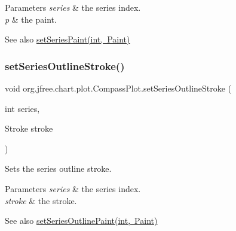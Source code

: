 \begin{DoxyParams}{Parameters}
{\em series} & the series index. \\
\hline
{\em p} & the paint.\\
\hline
\end{DoxyParams}
\begin{DoxySeeAlso}{See also}
\mbox{\hyperlink{classorg_1_1jfree_1_1chart_1_1plot_1_1_compass_plot_a87cfbe98bd7fff9715b80a2e03ca8132}{set\+Series\+Paint(int, Paint)}} 
\end{DoxySeeAlso}
\mbox{\label{classorg_1_1jfree_1_1chart_1_1plot_1_1_compass_plot_acf5f6f807b128ab9b24eda71da40f7d3}} 
\subsubsection{\texorpdfstring{set\+Series\+Outline\+Stroke()}{setSeriesOutlineStroke()}}
{\footnotesize\ttfamily void org.\+jfree.\+chart.\+plot.\+Compass\+Plot.\+set\+Series\+Outline\+Stroke (\begin{DoxyParamCaption}\item[{int}]{series,  }\item[{Stroke}]{stroke }\end{DoxyParamCaption})}

Sets the series outline stroke.


\begin{DoxyParams}{Parameters}
{\em series} & the series index. \\
\hline
{\em stroke} & the stroke.\\
\hline
\end{DoxyParams}
\begin{DoxySeeAlso}{See also}
\mbox{\hyperlink{classorg_1_1jfree_1_1chart_1_1plot_1_1_compass_plot_a4cc92c294efa38c6f1817ac71d48def9}{set\+Series\+Outline\+Paint(int, Paint)}} 
\end{DoxySeeAlso}
\mbox{\label{classorg_1_1jfree_1_1chart_1_1plot_1_1_compass_plot_a87cfbe98bd7fff9715b80a2e03ca8132}} 
